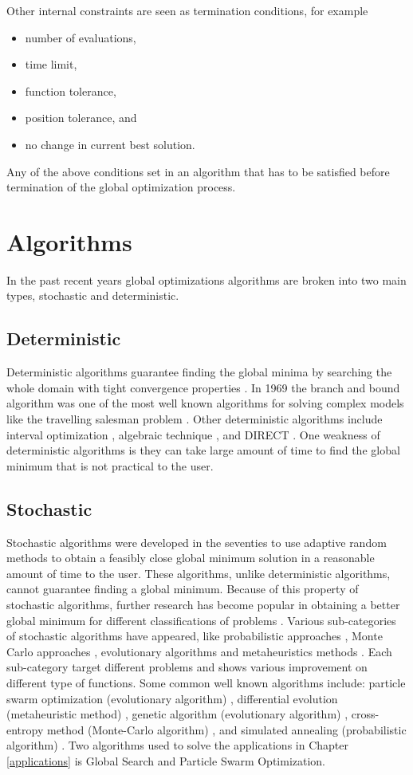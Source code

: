 Other internal constraints are seen as termination conditions, for example
\begin{itemize}
    \item number of evaluations,
    \item time limit,
    \item function tolerance,
    \item position tolerance, and
    \item no change in current best solution.
\end{itemize}

Any of the above conditions set in an algorithm that has to be satisfied before termination of the global optimization process. 

\section{Algorithms}
In the past recent years global optimizations algorithms are broken into two main types, stochastic and deterministic. 
\subsection{Deterministic}
Deterministic algorithms guarantee finding the global minima by searching the whole
domain with tight convergence properties \cite{Pinter2002}. In 1969 the branch and bound algorithm \cite{Liberti2000} was one of the most well known algorithms for solving complex models like the travelling salesman problem \cite{Liberti2000}. Other deterministic algorithms include interval optimization \cite{Accary2008}, algebraic technique \cite{Veltman1972}, and DIRECT \cite{Jones1993}. One weakness of deterministic algorithms is they can take large amount of time to find the global minimum that is not practical to the user. 
\subsection{Stochastic}
Stochastic algorithms were developed in the seventies to use adaptive random methods to obtain a feasibly close global minimum solution in a reasonable amount of time to the user. These algorithms, unlike deterministic algorithms, cannot guarantee finding a global minimum. Because of this property of stochastic algorithms, further research has become popular in obtaining a better global minimum for different classifications of problems \cite{Aguiar,Pinter2002}. Various sub-categories of
stochastic algorithms have appeared, like probabilistic approaches \cite{Aguiar}, Monte Carlo approaches \cite{Aguiar}, evolutionary algorithms \cite{Aguiar} and metaheuristics methods
\cite{Can2015}. Each sub-category target different problems
and shows various improvement on different type of functions. Some common well known algorithms include: particle swarm optimization (evolutionary algorithm) \cite{Kennedy1995}, differential evolution (metaheuristic method) \cite{Aguiar}, genetic algorithm (evolutionary algorithm) \cite{Aguiar}, cross-entropy method (Monte-Carlo algorithm) \cite{Aguiar}, and simulated annealing (probabilistic algorithm) \cite{Aguiar}. Two algorithms used to solve the applications in
Chapter \ref{applications} is Global Search and Particle Swarm Optimization.
